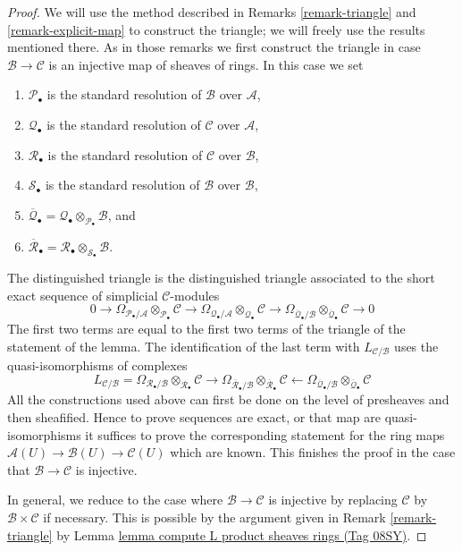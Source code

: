\documentclass{amsart}
\theoremstyle{plain}
\theoremstyle{definition}
\theoremstyle{remark}
\numberwithin{equation}{subsection}
\begin{document}
\begin{proof}
We will use the method described in
Remarks \ref{remark-triangle} and \ref{remark-explicit-map}
to construct the triangle; we will freely use the results mentioned there.
As in those remarks we first construct the triangle in case
$\mathcal{B} \to \mathcal{C}$ is an injective map of sheaves of rings.
In this case we set
\begin{enumerate}
\item $\mathcal{P}_\bullet$ is the standard resolution of $\mathcal{B}$
over $\mathcal{A}$,
\item $\mathcal{Q}_\bullet$ is the standard resolution of $\mathcal{C}$
over $\mathcal{A}$,
\item $\mathcal{R}_\bullet$ is the standard resolution of $\mathcal{C}$
over $\mathcal{B}$,
\item $\mathcal{S}_\bullet$ is the standard resolution of $\mathcal{B}$
over $\mathcal{B}$,
\item $\overline{\mathcal{Q}}_\bullet =
\mathcal{Q}_\bullet \otimes_{\mathcal{P}_\bullet} \mathcal{B}$, and
\item $\overline{\mathcal{R}}_\bullet =
\mathcal{R}_\bullet \otimes_{\mathcal{S}_\bullet} \mathcal{B}$.
\end{enumerate}
The distinguished triangle is the distinguished triangle associated
to the short exact sequence
of simplicial $\mathcal{C}$-modules
$$
0 \to
\Omega_{\mathcal{P}_\bullet/\mathcal{A}}
\otimes_{\mathcal{P}_\bullet} \mathcal{C} \to
\Omega_{\mathcal{Q}_\bullet/\mathcal{A}}
\otimes_{\mathcal{Q}_\bullet} \mathcal{C} \to
\Omega_{\overline{\mathcal{Q}}_\bullet/\mathcal{B}}
\otimes_{\overline{\mathcal{Q}}_\bullet} \mathcal{C} \to 0
$$
The first two terms are equal to the first two terms of the triangle
of the statement of the lemma. The identification of the last term with
$L_{\mathcal{C}/\mathcal{B}}$ uses the quasi-isomorphisms of complexes
$$
L_{\mathcal{C}/\mathcal{B}} =
\Omega_{\mathcal{R}_\bullet/\mathcal{B}}
\otimes_{\mathcal{R}_\bullet} \mathcal{C}
\longrightarrow
\Omega_{\overline{\mathcal{R}}_\bullet/\mathcal{B}}
\otimes_{\overline{\mathcal{R}}_\bullet} \mathcal{C}
\longleftarrow
\Omega_{\overline{\mathcal{Q}}_\bullet/\mathcal{B}}
\otimes_{\overline{\mathcal{Q}}_\bullet} \mathcal{C}
$$
All the constructions used above can first be done on the level
of presheaves and then sheafified. Hence to prove sequences are exact,
or that map are quasi-isomorphisms it suffices to prove the corresponding
statement for the ring maps
$\mathcal{A}(U) \to \mathcal{B}(U) \to \mathcal{C}(U)$
which are known. This finishes the proof in the case that
$\mathcal{B} \to \mathcal{C}$ is injective.

\medskip\noindent
In general, we reduce to the case where $\mathcal{B} \to \mathcal{C}$ is
injective by replacing $\mathcal{C}$ by $\mathcal{B} \times \mathcal{C}$ if
necessary. This is possible by the argument given in
Remark \ref{remark-triangle} by
Lemma \href{https://stacks.math.columbia.edu/tag/08SY}{lemma compute L product sheaves rings (Tag 08SY)}.
\end{proof}
\end{document}
